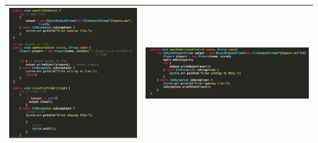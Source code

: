 \documentclass{article}
\begin{document}
\begin{enumerate}
\begin{tabulary}{0.5\textwidth}{| c | c |}
	\includegraphics[scale=0.4]{FileReadWriter-EXAMPLE-BEFORE.png} & \includegraphics[scale=0.4]{FileReaderWriter-EXAMPLE-AFTER.png} \\ \hline
	\end{tabulary}


\end{enumerate}
\end{document}
